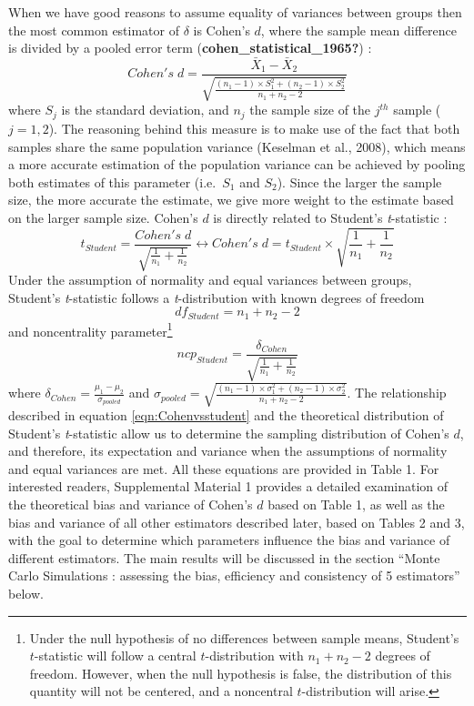 \documentclass[
  english,
  man]{apa6}
\begin{document}
When we have good reasons to assume equality of variances between groups then the most common estimator of \(\delta\) is Cohen's \(d\), where the sample mean difference is divided by a pooled error term (\textbf{cohen\_statistical\_1965?}) :
\begin{equation*} 
Cohen's \; d = \frac{\bar{X}_1-\bar{X}_2}{\sqrt{\frac{(n_1-1) \times S_1^2+(n_2-1) \times S_2^2}{n_1+n_2-2}}}
\label{eqn:Cohends}
\end{equation*}
where \(S_j\) is the standard deviation, and \(n_j\) the sample size of the \(j^{th}\) sample (\(j=1,2\)). The reasoning behind this measure is to make use of the fact that both samples share the same population variance (Keselman et al., 2008), which means a more accurate estimation of the population variance can be achieved by pooling both estimates of this parameter (i.e.~\(S_1\) and \(S_2\)). Since the larger the sample size, the more accurate the estimate, we give more weight to the estimate based on the larger sample size. Cohen's \(d\) is directly related to Student's \emph{t}-statistic :
\begin{equation} 
t_{Student}=\frac{Cohen's \; d}{\sqrt{\frac{1}{n_1}+\frac{1}{n_2}}}\leftrightarrow Cohen's \; d =  t_{Student} \times \sqrt{\frac{1}{n_1}+\frac{1}{n_2}}
\label{eqn:Cohenvsstudent}
\end{equation}
Under the assumption of normality and equal variances between groups, Student's \emph{t}-statistic follows a \emph{t}-distribution with known degrees of freedom
\begin{equation} 
df_{Student} = n_1+n_2-2
\label{eqn:studentdf}
\end{equation}
and noncentrality parameter\footnote{Under the null hypothesis of no differences between sample means, Student's $t$-statistic will follow a central $t$-distribution with $n_1+n_2-2$ degrees of freedom. However, when the null hypothesis is false, the distribution of this quantity will not be centered, and a noncentral $t$-distribution will arise.}
\[ncp_{Student} = \frac{\delta_{Cohen}}{\sqrt{\frac{1}{n_1}+\frac{1}{n_2}}}\]
where \(\delta_{Cohen}= \frac{\mu_1-\mu_2}{\sigma_{pooled}}\) and \(\sigma_{pooled}= \sqrt{\frac{(n_1-1) \times \sigma^2_1+(n_2-1) \times \sigma^2_2}{n_1+n_2-2}}\). The relationship described in equation \ref{eqn:Cohenvsstudent} and the theoretical distribution of Student's \emph{t}-statistic allow us to determine the sampling distribution of Cohen's \(d\), and therefore, its expectation and variance when the assumptions of normality and equal variances are met. All these equations are provided in Table 1. For interested readers, Supplemental Material 1 provides a detailed examination of the theoretical bias and variance of Cohen's \(d\) based on Table 1, as well as the bias and variance of all other estimators described later, based on Tables 2 and 3, with the goal to determine which parameters influence the bias and variance of different estimators. The main results will be discussed in the section ``Monte Carlo Simulations : assessing the bias, efficiency and consistency of 5 estimators'' below.
\end{document}
